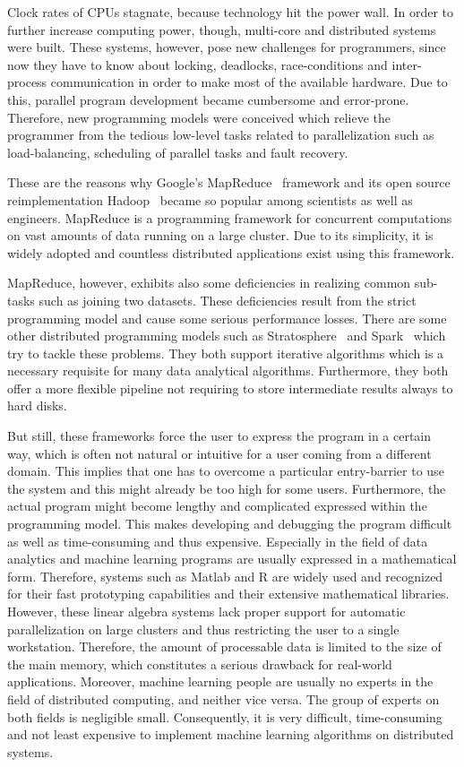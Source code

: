 \documentclass{dima}
\begin{document}
Clock rates of CPUs stagnate, because technology hit the power wall.
In order to further increase computing power, though, multi-core and distributed systems were built.
These systems, however, pose new challenges for programmers, since now they have to know about locking, deadlocks, race-conditions and inter-process communication in order to make most of the available hardware.
Due to this, parallel program development became cumbersome and error-prone.
Therefore, new programming models were conceived which relieve the programmer from the tedious low-level tasks related to parallelization such as load-balancing, scheduling of parallel tasks and fault recovery.

These are the reasons why Google's MapReduce~\cite{dean:c2008a} framework and its open source reimplementation Hadoop~\cite{hadoop:2008a} became so popular among scientists as well as engineers.
MapReduce is a programming framework for concurrent computations on vast amounts of data running on a large cluster. 
Due to its simplicity, it is widely adopted and countless distributed applications exist using this framework.

MapReduce, however, exhibits also some deficiencies in realizing common sub-tasks such as joining two datasets.
These deficiencies result from the strict programming model and cause some serious performance losses.
There are some other distributed programming models such as Stratosphere~\cite{battre:2010a} and Spark~\cite{zaharia:2010a} which try to tackle these problems.
They both support iterative algorithms which is a necessary requisite for many data analytical algorithms.
Furthermore, they both offer a more flexible pipeline not requiring to store intermediate results always to hard disks.

But still, these frameworks force the user to express the program in a certain way, which is often not natural or intuitive for a user coming from a different domain.
This implies that one has to overcome a particular entry-barrier to use the system and this might already be too high for some users.
Furthermore, the actual program might become lengthy and complicated expressed within the programming model.
This makes developing and debugging the program difficult as well as time-consuming and thus expensive.
Especially in the field of data analytics and machine learning programs are usually expressed in a mathematical form.
Therefore, systems such as Matlab and R are widely used and recognized for their fast prototyping capabilities and their extensive mathematical libraries.
However, these linear algebra systems lack proper support for automatic parallelization on large clusters and thus restricting the user to a single workstation.
Therefore, the amount of processable data is limited to the size of the main memory, which constitutes a serious drawback for real-world applications.
Moreover, machine learning people are usually no experts in the field of distributed computing, and neither vice versa.
The group of experts on both fields is negligible small.
Consequently, it is very difficult, time-consuming and not least expensive to implement machine learning algorithms on distributed systems.
\end{document}
